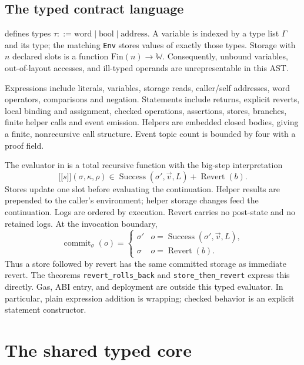 \documentclass[conference]{IEEEtran}
\newcommand{\W}{\mathbb W}
\newcommand{\eval}[1]{\mathopen{[\![}#1\mathclose{]\!]}}
\newcommand{\code}[1]{\texttt{#1}}
\begin{document}
\subsection{The typed contract language}
 defines types
$\tau::=\mathrm{word}\mid\mathrm{bool}\mid\mathrm{address}$.
A variable is indexed by a type list $\Gamma$ and its type; the matching
\code{Env} stores values of exactly those types. Storage with $n$ declared
slots is a function $\mathrm{Fin}(n)\to\W$. Consequently, unbound variables,
out-of-layout accesses, and ill-typed operands are unrepresentable in this AST.

Expressions include literals, variables, storage reads, caller/self addresses,
word operators, comparisons and negation. Statements include returns, explicit
reverts, local binding and assignment, checked operations, assertions, stores,
branches, finite helper calls and event emission. Helpers are embedded closed
bodies, giving a finite, nonrecursive call structure. Event topic count is
bounded by four with a proof field.

The evaluator in  is a total recursive
function with the big-step interpretation
\[
 \eval{s}(\sigma,\kappa,\rho)
 \in \operatorname{Success}(\sigma',\vec v,L)
       +\operatorname{Revert}(b).
\]
Stores update one slot before evaluating the continuation. Helper results are
prepended to the caller's environment; helper storage changes feed the
continuation. Logs are ordered by execution. Revert carries no post-state and
no retained logs. At the invocation boundary,
\[
 \operatorname{commit}_{\sigma}(o)=
 \begin{cases}\sigma'&o=\operatorname{Success}(\sigma',\vec v,L),\\
 \sigma&o=\operatorname{Revert}(b).
 \end{cases}
\]
Thus a store followed by revert has the same committed storage as immediate
revert. The theorems \code{revert\_rolls\_back} and
\code{store\_then\_revert} express this directly. Gas, ABI entry, and deployment
are outside this typed evaluator. In particular, plain expression addition is
wrapping; checked behavior is an explicit statement constructor.

\section{The shared typed core}
\end{document}
